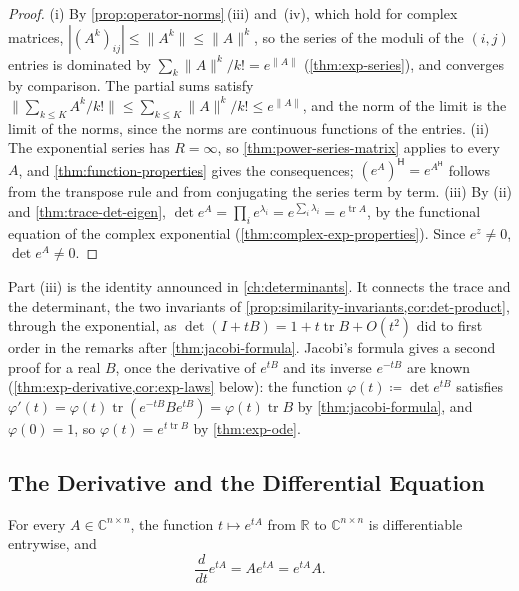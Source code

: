 \begin{proof}
(i) By \cref{prop:operator-norms}\,(iii) and~(iv), which hold for complex matrices, $|(A^k)_{ij}|\le\|A^k\|\le\|A\|^k$, so the series of the moduli of the $(i,j)$ entries is dominated by $\sum_k\|A\|^k/k!=e^{\|A\|}$ (\cref{thm:exp-series}), and converges by comparison. The partial sums satisfy $\|\sum_{k\le K}A^k/k!\|\le\sum_{k\le K}\|A\|^k/k!\le e^{\|A\|}$, and the norm of the limit is the limit of the norms, since the norms are continuous functions of the entries. (ii) The exponential series has $R=\infty$, so \cref{thm:power-series-matrix} applies to every $A$, and \cref{thm:function-properties} gives the consequences; $(e^A)^{\mathsf H}=e^{A^{\mathsf H}}$ follows from the transpose rule and from conjugating the series term by term. (iii) By (ii) and \cref{thm:trace-det-eigen}, $\det e^A=\prod_ie^{\lambda_i}=e^{\sum_i\lambda_i}=e^{\operatorname{tr}A}$, by the functional equation of the complex exponential (\cref{thm:complex-exp-properties}). Since $e^z\ne0$, $\det e^A\ne0$.
\end{proof}

Part (iii) is the identity announced in \cref{ch:determinants}. It connects the trace and the determinant, the two invariants of \cref{prop:similarity-invariants,cor:det-product}, through the exponential, as $\det(I+tB)=1+t\operatorname{tr}B+O(t^2)$ did to first order in the remarks after \cref{thm:jacobi-formula}. Jacobi's formula gives a second proof for a real $B$, once the derivative of $e^{tB}$ and its inverse $e^{-tB}$ are known (\cref{thm:exp-derivative,cor:exp-laws} below): the function $\varphi(t)\coloneqq\det e^{tB}$ satisfies $\varphi'(t)=\varphi(t)\operatorname{tr}(e^{-tB}Be^{tB})=\varphi(t)\operatorname{tr}B$ by \cref{thm:jacobi-formula}, and $\varphi(0)=1$, so $\varphi(t)=e^{t\operatorname{tr}B}$ by \cref{thm:exp-ode}.

\subsection{The Derivative and the Differential Equation}

\begin{theorem}
\label{thm:exp-derivative}
For every $A\in\mathbb C^{n\times n}$, the function $t\mapsto e^{tA}$ from $\mathbb R$ to $\mathbb C^{n\times n}$ is differentiable entrywise, and
\[
\frac d{dt}e^{tA}=Ae^{tA}=e^{tA}A .
\]
\end{theorem}

